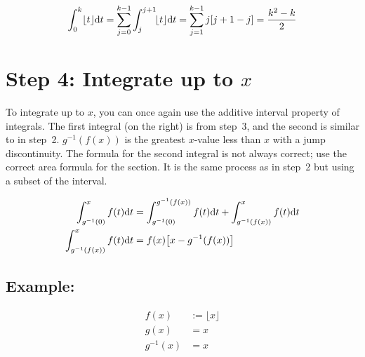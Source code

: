 \documentclass[12pt]{article}
\begin{document}
		\begin{align*}
			\int_0^k\lfloor t\rfloor\text dt
			= \sum_{j=0}^{k-1}\int_j^{j+1}\!\lfloor t\rfloor\text dt
			= \sum_{j=1}^{k-1}j[j+1-j]
			= \frac{k^2-k}2
		\end{align*}

\section*{Step 4: Integrate up to $x$}

	To integrate up to $x$, you can once again use the additive interval property of integrals. The first integral (on the right) is from step~3, and the second is similar to in step~2. $g^{-1}(f(x))$ is
	the greatest $x$-value less than $x$ with a jump discontinuity. The formula for the second integral
	is not always correct; use the correct area formula for the section. It is the same process as in
	step~2 but using a subset of the interval.

	\begin{align*}
		\int_{g^{-1}(0)}^xf(t)\text dt & = \int_{g^{-1}(0)}^{g^{-1}(f(x))}f(t)\text dt+\int_{g^{-1}(f(x))}^xf(t)\text dt\\
		\int_{g^{-1}(f(x))}^xf(t)\text dt & = f(x)\!\left[x-g^{-1}(f(x))\right]
	\end{align*}

	\subsection*{Example:}

		\begin{minipage}{0.5\textwidth}
			\begin{align*}
				f(x) & := \lfloor x\rfloor\\
				g(x) & = x\\
				g^{-1}(x) & = x
			\end{align*}
		\end{minipage}
		\hfill
		\begin{minipage}{0.5\textwidth}
		\end{minipage}
\end{document}
